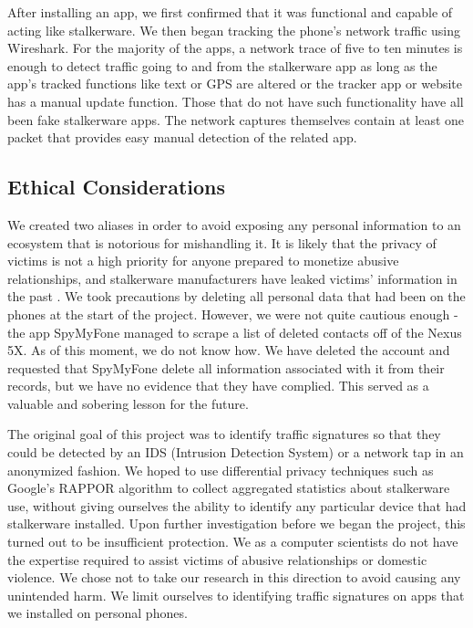 \documentclass[acmtog]{acmart}
\begin{document}
After installing an app, we first confirmed that it was functional and capable 
of acting like stalkerware. 
We then began tracking the phone's network traffic using Wireshark. For the 
majority of the apps, a network trace 
of five to ten minutes is enough to detect traffic going to and from the 
stalkerware app as long as the app's tracked functions like text or GPS are 
altered or the tracker app or website has a manual update function. Those that 
do not have such functionality have all been fake stalkerware apps. The network 
captures themselves contain at least one packet that provides easy manual 
detection of the related app.

\subsection{Ethical Considerations}

We created two aliases in order to avoid exposing any personal information to 
an ecosystem that is notorious for mishandling it\cite{ristenpart_ucsd_talk}. 
It is likely that the privacy of victims is 
not a high priority for anyone prepared to monetize abusive relationships, and 
stalkerware manufacturers have leaked victims' information in the past 
\cite{koebler_stalkerware_2018}. We took precautions by deleting all personal 
data that had been on the phones at the start of the project. However, we were 
not quite cautious enough - the app SpyMyFone managed to scrape a list of 
deleted contacts off of the Nexus 5X. As of this moment, we do not know how. We 
have deleted the account and requested that SpyMyFone delete all information 
associated with it from their records, but we have no evidence that they have 
complied. This served as a valuable and sobering lesson for the future.

The original goal of this project was to identify traffic signatures so that 
they could be detected by an IDS (Intrusion Detection System) or a network 
tap in an anonymized fashion. We hoped to use differential privacy techniques 
such as Google's RAPPOR algorithm \cite{erlingsson_rappor:_2014} to collect 
aggregated statistics about stalkerware use, without giving ourselves the 
ability to identify any particular device that had stalkerware installed. Upon 
further investigation before we began the project, this turned out to be 
insufficient protection. We as a computer 
scientists do not have the expertise required to assist victims of abusive 
relationships or domestic violence. We chose not to take our research in this 
direction to avoid causing any unintended harm. We limit ourselves to 
identifying traffic signatures on apps that we installed on personal phones.
\end{document}
